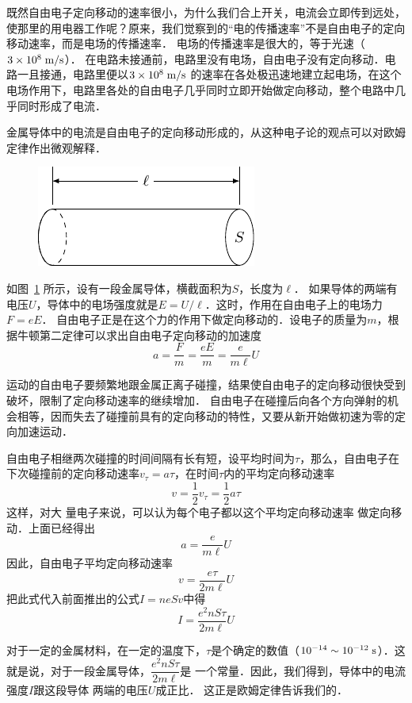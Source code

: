 既然自由电子定向移动的速率很小，为什么我们合上开关，电流会立即传到远处，使那里的用电器工作呢？原来，我们觉察到的“电的传播速率”不是自由电子的定向移动速率，而是电场的传播速率．
电场的传播速率是很大的，等于光速（$3\times10^8\;\text{m}/\text{s}$）．
在电路未接通前，电路里没有电场，自由电子没有定向移动．电路一且接通，电路里便以$3\times10^8\;\text{m}/\text{s}$
的速率在各处极迅速地建立起电场，在这个电场作用下，电路里各处的自由电子几乎同时立即开始做定向移动，整个电路中几乎同时形成了电流．

金属导体中的电流是自由电子的定向移动形成的，从这种电子论的观点可以对欧姆定律作出微观解释．
\begin{figure}[htbp]
    \centering
    \includegraphics{fig/B/8-2.pdf}
    \caption{}\label{fig_B_8-2}
\end{figure}

如图~\ref{fig_B_8-2} 所示，设有一段金属导体，横截面积为$S$，长度为$\ell$． 如果导体的两端有电压$U$，导体中的电场强度就是$E=U/\ell$．这时，作用在自由电子上的电场力$F=eE$． 自由电子正是在这个力的作用下做定向移动的．设电子的质量为$m$，根
据牛顿第二定律可以求出自由电子定向移动的加速度
\[a=\frac{F}{m}=\frac{eE}{m}=\frac{e}{m\ell}U\]

运动的自由电子要频繁地跟金属正离子碰撞，结果使自由电子的定向移动很快受到破坏，限制了定向移动速率的继续增加．
自由电子在碰撞后向各个方向弹射的机会相等，因而失去了碰撞前具有的定向移动的特性，又要从新开始做初速为零的定向加速运动．

自由电子相继两次碰撞的时间间隔有长有短，设平均时间为$\tau$，那么，自由电子在下次碰撞前的定向移动速率$v_{\tau}=a\tau$，在时间$\tau$内的平均定向移动速率
\[v=\frac{1}{2}v_{\tau}=\frac{1}{2}a\tau\]
这样，对大
量电子来说，可以认为每个电子都以这个平均定向移动速率
做定向移动．上面已经得出
\[a=\frac{e}{m\ell}U\]
因此，自由电子平均定向移动速率
\[v=\frac{e\tau}{2m\ell}U\]
把此式代入前面推出的公式$I=neSv$中得
\[I=\frac{e^2 nS\tau}{2m\ell}U\]

对于一定的金属材料，在一定的温度下，$\tau$是个确定的数值（$10^{-14} \sim 10^{-12} \;\text{s} $）．这就是说，对于一段金属导体，$\dfrac{e^2 nS\tau}{2m\ell}$是
一个常量．因此，我们得到，导体中的电流强度$I$跟这段导体
两端的电压$U$成正比．
这正是欧姆定律告诉我们的．

